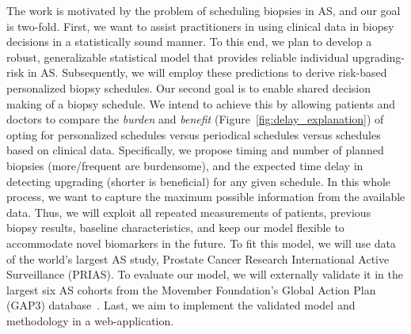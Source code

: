 The work is motivated by the problem of scheduling biopsies in AS, and our goal is two-fold. First, we want to assist practitioners in using clinical data in biopsy decisions in a statistically sound manner. To this end, we plan to develop a robust, generalizable statistical model that provides reliable individual upgrading-risk in AS. Subsequently, we will employ these predictions to derive risk-based personalized biopsy schedules. Our second goal is to enable shared decision making of a biopsy schedule. We intend to achieve this by allowing patients and doctors to compare the \emph{burden} and \emph{benefit} (Figure~\ref{fig:delay_explanation}) of opting for personalized schedules versus periodical schedules versus schedules based on clinical data. Specifically, we propose timing and number of planned biopsies (more/frequent are burdensome), and the expected time delay in detecting upgrading (shorter is beneficial) for any given schedule. In this whole process, we want to capture the maximum possible information from the available data. Thus, we will exploit all repeated measurements of patients, previous biopsy results, baseline characteristics, and keep our model flexible to accommodate novel biomarkers in the future. To fit this model, we will use data of the world's largest AS study, Prostate Cancer Research International Active Surveillance (PRIAS). To evaluate our model, we will externally validate it in the largest six AS cohorts from the Movember Foundation's Global Action Plan (GAP3) database~\citep{gap3_2018}. Last, we aim to implement the validated model and methodology in a web-application.